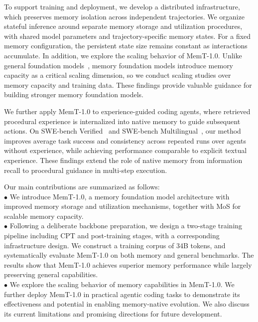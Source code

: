 To support training and deployment, we develop a distributed infrastructure, which preserves memory isolation across independent trajectories.
We organize stateful inference around separate memory storage and utilization procedures, with shared model parameters and trajectory-specific memory states.
For a fixed memory configuration, the persistent state size remains constant as interactions accumulate.
In addition, we explore the scaling behavior of MemT-1.0.
Unlike general foundation models~\cite{kaplan2020scalinglawsneurallanguage}, memory foundation models introduce memory capacity as a critical scaling dimension, so we conduct scaling studies over memory capacity and training data.
These findings provide valuable guidance for building stronger memory foundation models.

We further apply MemT-1.0 to experience-guided coding agents, where retrieved procedural experience is internalized into native memory to guide subsequent actions.
On SWE-bench Verified~\cite{chowdhury2024swebenchverified} and SWE-bench Multilingual~\cite{Yang2025SWEsmithSD}, our method improves average task success and consistency across repeated runs over agents without experience, while achieving performance comparable to explicit textual experience.
These findings extend the role of native memory from information recall to procedural guidance in multi-step execution.

Our main contributions are summarized as follows: \\
$\bullet$ We introduce MemT-1.0, a memory foundation model architecture with improved memory storage and utilization mechanisms, together with MoS for scalable memory capacity.\\
$\bullet$ Following a deliberate backbone preparation, we design a two-stage training pipeline including CPT and post-training stages, with a corresponding infrastructure design.
We construct a training corpus of 34B tokens, and systematically evaluate MemT-1.0 on both memory and general benchmarks. The results show that MemT-1.0 achieves superior memory performance while largely preserving general capabilities. \\
$\bullet$ We explore the scaling behavior of memory capabilities in MemT-1.0.
We further deploy MemT-1.0 in practical agentic coding tasks to demonstrate its effectiveness and potential in enabling memory-native evolution.
We also discuss its current limitations and promising directions for future development.
